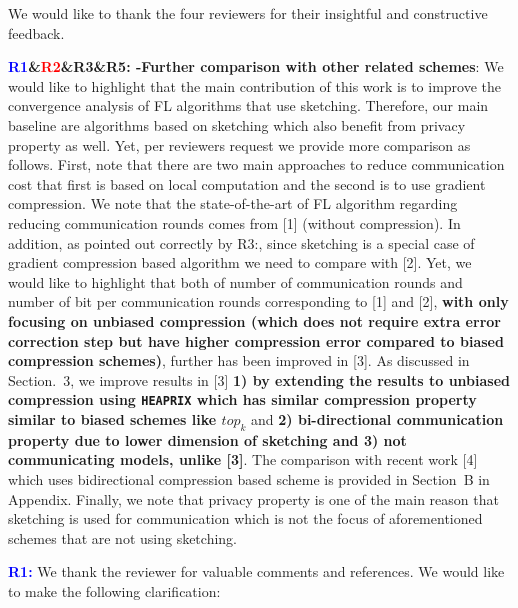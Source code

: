 \documentclass{article}
\begin{document}
We would like to thank the four reviewers for their insightful and constructive feedback. 

\textbf{\textcolor{blue}{R1}\&\textcolor{red}{R2}\&\textbf{\color{yellow!50!black}R3}\&\textbf{\textcolor{green!50!black}{R5:}} -Further comparison with other related schemes}: We would like to highlight that the main contribution of this work is to improve the convergence analysis of FL algorithms that use sketching. Therefore, our main baseline are algorithms based on sketching which also {benefit from privacy property as well}. Yet, per reviewers request we provide more comparison as follows. First, note that there are two main approaches to reduce communication cost that first is based on local computation and the second is to use gradient compression. We note that the state-of-the-art of FL algorithm regarding reducing communication rounds comes from [1] (without compression). In addition, as pointed out correctly by \textcolor{yellow!50!black}{R3:}, since sketching is a special case of gradient compression based algorithm we need to compare with [2]. Yet, we would like to highlight that both of number of communication rounds and number of bit per communication rounds corresponding to [1] and [2], \textbf{with only focusing on unbiased compression (which does not require extra error correction step but have higher compression error compared to biased compression schemes)}, further has been improved in [3]. As discussed in Section.~3, we improve results in [3] \textbf{1) by extending the results to unbiased compression  using \texttt{HEAPRIX} which has similar compression property similar to biased schemes like $top_k$} and \textbf{2)  bi-directional communication property due to lower dimension of sketching and 3) not communicating models, unlike [3]}.  The comparison with recent work [4] which uses bidirectional compression based scheme is provided in Section~B in Appendix. Finally, we note that privacy property is one of the main reason that sketching is used for communication which is not the focus of aforementioned schemes that are not using sketching.



\textbf{\textcolor{blue}{R1:}} We thank the reviewer for valuable comments and references. We would like to make the following clarification:\vspace{-1.5pt} 
\end{document}

